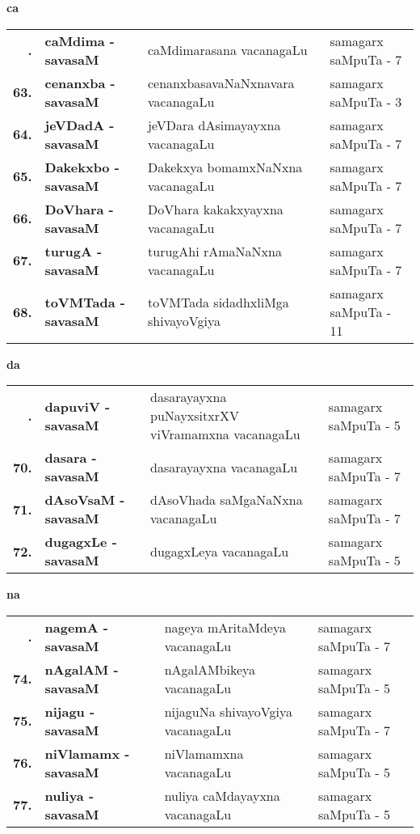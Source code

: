 \smallskip

\centerline{\bf ca}

{\renewcommand{\arraystretch}{1.35}
\begin{longtable}{>{\bf}r>{\bf}l>{\raggedright}p{8cm}l}
\endfirsthead
\endhead
\endfoot
\endlastfoot
62. &   caMdima - savasaM &  caMdimarasana vacanagaLu & samagarx saMpuTa - 7 \\
63. &   cenanxba - savasaM &  cenanxbasavaNaNxnavara vacanagaLu & samagarx saMpuTa - 3 \\
64. &   jeVDadA - savasaM &  jeVDara dAsimayayxna vacanagaLu & samagarx saMpuTa - 7 \\
65. &  Dakekxbo - savasaM &  Dakekxya bomamxNaNxna vacanagaLu & samagarx saMpuTa - 7 \\
66. & DoVhara - savasaM & DoVhara kakakxyayxna vacanagaLu & samagarx saMpuTa - 7 \\
67. &  turugA - savasaM &  turugAhi rAmaNaNxna vacanagaLu & samagarx saMpuTa - 7 \\
68. &  toVMTada - savasaM & toVMTada sidadhxliMga shivayoVgiya & samagarx saMpuTa - 11
\end{longtable}}

\smallskip

\centerline{\bf da}

{\renewcommand{\arraystretch}{1.35}
\begin{longtable}{>{\bf}r>{\bf}l>{\raggedright}p{8cm}l}
\endfirsthead
\endhead
\endfoot
\endlastfoot
69. &  dapuviV - savasaM & dasarayayxna puNayxsitxrXV viVramamxna vacanagaLu & samagarx saMpuTa - 5\\
70. &  dasara - savasaM &  dasarayayxna vacanagaLu & samagarx saMpuTa - 7 \\
71. &  dAsoVsaM - savasaM & dAsoVhada saMgaNaNxna vacanagaLu & samagarx saMpuTa - 7 \\
72. &  dugagxLe - savasaM & dugagxLeya vacanagaLu & samagarx saMpuTa - 5
\end{longtable}}

\smallskip

\centerline{\bf na}

{\renewcommand{\arraystretch}{1.35}
\begin{longtable}{>{\bf}r>{\bf}l>{\raggedright}p{8cm}l}
\endfirsthead
\endhead
\endfoot
\endlastfoot
73. & nagemA - savasaM &  nageya mAritaMdeya vacanagaLu & samagarx saMpuTa - 7\\
74. & nAgalAM  - savasaM & nAgalAMbikeya vacanagaLu & samagarx saMpuTa - 5 \\
75. & nijagu  - savasaM & nijaguNa shivayoVgiya vacanagaLu & samagarx saMpuTa - 7 \\
76. & niVlamamx  - savasaM & niVlamamxna vacanagaLu & samagarx saMpuTa - 5 \\
77. & nuliya  - savasaM & nuliya caMdayayxna vacanagaLu & samagarx saMpuTa - 5
\end{longtable}}
\smallskip

